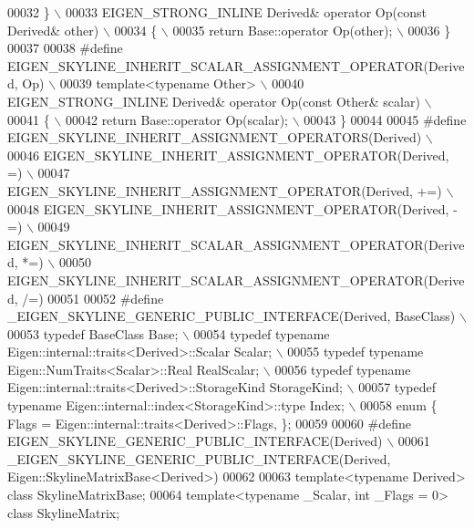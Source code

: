 \begin{DoxyCode}
00032 \textcolor{preprocessor}{\} \(\backslash\)}
00033 \textcolor{preprocessor}{EIGEN\_STRONG\_INLINE Derived& operator Op(const Derived& other) \(\backslash\)}
00034 \textcolor{preprocessor}{\{ \(\backslash\)}
00035 \textcolor{preprocessor}{  return Base::operator Op(other); \(\backslash\)}
00036 \textcolor{preprocessor}{\}}
00037 
00038 \textcolor{preprocessor}{#define EIGEN\_SKYLINE\_INHERIT\_SCALAR\_ASSIGNMENT\_OPERATOR(Derived, Op) \(\backslash\)}
00039 \textcolor{preprocessor}{template<typename Other> \(\backslash\)}
00040 \textcolor{preprocessor}{EIGEN\_STRONG\_INLINE Derived& operator Op(const Other& scalar) \(\backslash\)}
00041 \textcolor{preprocessor}{\{ \(\backslash\)}
00042 \textcolor{preprocessor}{  return Base::operator Op(scalar); \(\backslash\)}
00043 \textcolor{preprocessor}{\}}
00044 
00045 \textcolor{preprocessor}{#define EIGEN\_SKYLINE\_INHERIT\_ASSIGNMENT\_OPERATORS(Derived) \(\backslash\)}
00046 \textcolor{preprocessor}{  EIGEN\_SKYLINE\_INHERIT\_ASSIGNMENT\_OPERATOR(Derived, =) \(\backslash\)}
00047 \textcolor{preprocessor}{  EIGEN\_SKYLINE\_INHERIT\_ASSIGNMENT\_OPERATOR(Derived, +=) \(\backslash\)}
00048 \textcolor{preprocessor}{  EIGEN\_SKYLINE\_INHERIT\_ASSIGNMENT\_OPERATOR(Derived, -=) \(\backslash\)}
00049 \textcolor{preprocessor}{  EIGEN\_SKYLINE\_INHERIT\_SCALAR\_ASSIGNMENT\_OPERATOR(Derived, *=) \(\backslash\)}
00050 \textcolor{preprocessor}{  EIGEN\_SKYLINE\_INHERIT\_SCALAR\_ASSIGNMENT\_OPERATOR(Derived, /=)}
00051 
00052 \textcolor{preprocessor}{#define \_EIGEN\_SKYLINE\_GENERIC\_PUBLIC\_INTERFACE(Derived, BaseClass) \(\backslash\)}
00053 \textcolor{preprocessor}{  typedef BaseClass Base; \(\backslash\)}
00054 \textcolor{preprocessor}{  typedef typename Eigen::internal::traits<Derived>::Scalar Scalar; \(\backslash\)}
00055 \textcolor{preprocessor}{  typedef typename Eigen::NumTraits<Scalar>::Real RealScalar; \(\backslash\)}
00056 \textcolor{preprocessor}{  typedef typename Eigen::internal::traits<Derived>::StorageKind StorageKind; \(\backslash\)}
00057 \textcolor{preprocessor}{  typedef typename Eigen::internal::index<StorageKind>::type Index; \(\backslash\)}
00058 \textcolor{preprocessor}{  enum \{  Flags = Eigen::internal::traits<Derived>::Flags, \};}
00059 
00060 \textcolor{preprocessor}{#define EIGEN\_SKYLINE\_GENERIC\_PUBLIC\_INTERFACE(Derived) \(\backslash\)}
00061 \textcolor{preprocessor}{  \_EIGEN\_SKYLINE\_GENERIC\_PUBLIC\_INTERFACE(Derived, Eigen::SkylineMatrixBase<Derived>)}
00062 
00063 \textcolor{keyword}{template}<\textcolor{keyword}{typename} Derived> \textcolor{keyword}{class }SkylineMatrixBase;
00064 \textcolor{keyword}{template}<\textcolor{keyword}{typename} \_Scalar, \textcolor{keywordtype}{int} \_Flags = 0> \textcolor{keyword}{class }SkylineMatrix;

\end{DoxyCode}
